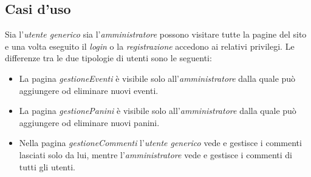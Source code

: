 \subsection{Casi d'uso}
Sia l'\emph{utente generico} sia l'\emph{amministratore} possono visitare tutte la pagine del sito e una volta eseguito il \emph{login} o la \emph{registrazione} accedono ai relativi privilegi.
Le differenze tra le due tipologie di utenti sono le seguenti:
\begin{itemize}
	\item La pagina \emph{gestioneEventi} è visibile solo all'\emph{amministratore} dalla quale può aggiungere od eliminare nuovi eventi.
	\item La pagina \emph{gestionePanini} è visibile solo all'\emph{amministratore} dalla quale può aggiungere od eliminare nuovi panini.
	\item Nella pagina \emph{gestioneCommenti} l'\emph{utente generico} vede e gestisce i commenti lasciati solo da lui, mentre l'\emph{amministratore} vede e gestisce i commenti di tutti gli utenti.
\end{itemize}